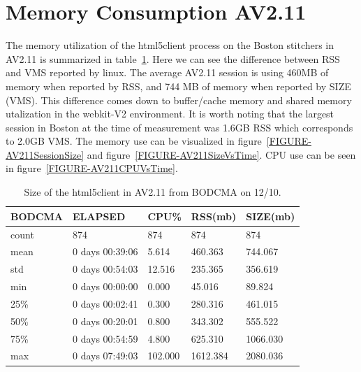 \documentclass{article}
\begin{document}
\section{Memory Consumption AV2.11}
\label{SECTION-211Memory}


The memory utilization of the html5client process on the Boston stitchers in AV2.11 is summarized in table~\ref{TABLE-AV211SessionSize}. Here we can see the difference between RSS and VMS reported by linux. The average AV2.11 session is using 460MB of memory when reported by RSS, and 744 MB of memory when reported by SIZE (VMS). This difference comes down to buffer/cache memory and shared memory utalization in the webkit-V2 environment. It is worth noting that the largest session in Boston at the time of measurement was 1.6GB RSS which corresponds to 2.0GB VMS. The memory use can be visualized in figure~\ref{FIGURE-AV211SessionSize} and figure~\ref{FIGURE-AV211SizeVsTime}. CPU use can be seen in figure~\ref{FIGURE-AV211CPUVsTime}.



\begin{table}[H]
\begin{tabular}{|l|l|l|l|l|}
\hline BODCMA&        ELAPSED&        CPU\%&      RSS(mb)&     SIZE(mb) \\
\hline count&                     874&  874&   874&   874 \\
\hline mean&   0 days 00:39:06&    5.614&   460.363&   744.067 \\
\hline std&    0 days 00:54:03&   12.516&   235.365&   356.619 \\
\hline min&           0 days 00:00:00&    0.000&    45.016&    89.824 \\
\hline 25\%&    0 days 00:02:41&    0.300&   280.316&   461.015 \\
\hline 50\%&           0 days 00:20:01&    0.800&   343.302&   555.522 \\
\hline 75\%&    0 days 00:54:59&    4.800&   625.310&  1066.030 \\
\hline max&           0 days 07:49:03&  102.000&  1612.384&  2080.036 \\
\hline 
\end{tabular}
\caption{\label{TABLE-AV211SessionSize}Size of the html5client in AV2.11 from BODCMA on 12/10.} 
\end{table}
\end{document}
